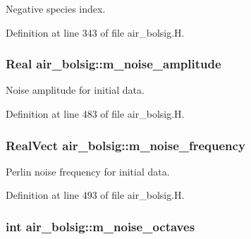 Negative species index. 



Definition at line 343 of file air\+\_\+bolsig.\+H.

\subsubsection[{\texorpdfstring{m\+\_\+noise\+\_\+amplitude}{m_noise_amplitude}}]{\setlength{\rightskip}{0pt plus 5cm}Real air\+\_\+bolsig\+::m\+\_\+noise\+\_\+amplitude\hspace{0.3cm}{\ttfamily [protected]}}\hypertarget{classair__bolsig_ae36aece9648fe731145d7485bafed90e}{}\label{classair__bolsig_ae36aece9648fe731145d7485bafed90e}


Noise amplitude for initial data. 



Definition at line 483 of file air\+\_\+bolsig.\+H.

\subsubsection[{\texorpdfstring{m\+\_\+noise\+\_\+frequency}{m_noise_frequency}}]{\setlength{\rightskip}{0pt plus 5cm}Real\+Vect air\+\_\+bolsig\+::m\+\_\+noise\+\_\+frequency\hspace{0.3cm}{\ttfamily [protected]}}\hypertarget{classair__bolsig_aca54e455884cc4d3f5c77bcd6dcd9f76}{}\label{classair__bolsig_aca54e455884cc4d3f5c77bcd6dcd9f76}


Perlin noise frequency for initial data. 



Definition at line 493 of file air\+\_\+bolsig.\+H.

\subsubsection[{\texorpdfstring{m\+\_\+noise\+\_\+octaves}{m_noise_octaves}}]{\setlength{\rightskip}{0pt plus 5cm}int air\+\_\+bolsig\+::m\+\_\+noise\+\_\+octaves\hspace{0.3cm}{\ttfamily [protected]}}\hypertarget{classair__bolsig_ae108e137903ffb2d32e20b0060e86f79}{}\label{classair__bolsig_ae108e137903ffb2d32e20b0060e86f79}


